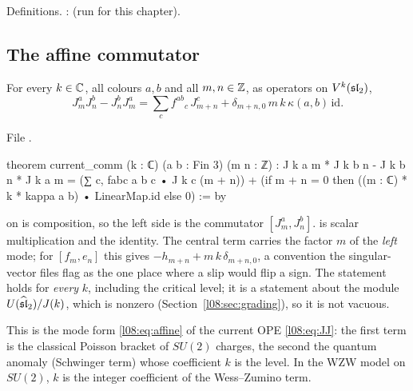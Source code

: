 \begin{status}
Definitions. : \lean{[propext, Classical.}\allowbreak{}\allowbreak\lean{sound]} (run for
this chapter).
\end{status}

\subsection{The affine commutator}

\begin{theorem}\label{l08:thm:currentcomm}
For every $k\in{\mathbb{C}}$, all colours $a,b$ and all $m,n\in{\mathbb{Z}}$, as operators on $V^k(\mathfrak{sl}_2)$,
\begin{equation*}
  J^a_mJ^b_n - J^b_nJ^a_m = \sum_c f^{ab}{}_c\,J^c_{m+n} + \delta_{m+n,0}\,m\,k\,\kappa(a,b)\,\mathrm{id}.
\end{equation*}
\end{theorem}

\noindent File .
\begin{leancode}
theorem current_comm (k : ℂ) (a b : Fin 3) (m n : ℤ) :
    J k a m * J k b n - J k b n * J k a m
      = (∑ c, fabc a b c • J k c (m + n))
        + (if m + n = 0 then ((m : ℂ) * k * kappa a b) • LinearMap.id else 0) := by
\end{leancode}

\begin{dictionary}
\lean{*} on \allowbreak{} is composition, so the left side is the commutator
$[J^a_m,J^b_n]$.  is scalar multiplication and  the identity. The central
term carries the factor $m$ of the \emph{left} mode; for $[f_m,e_n]$ this gives
$-h_{m+n}+m\,k\,\delta_{m+n,0}$, a convention the singular-vector files flag as the one place where a
slip would flip a sign. The statement holds for \emph{every} $k$, including the critical level; it is a
statement about the module $U(\widehat{\mathfrak{sl}}_2)/J(k)$, which is nonzero (Section~\ref{l08:sec:grading}),
so it is not vacuous.
\end{dictionary}

\begin{physics}
This is the mode form \eqref{l08:eq:affine} of the current OPE \eqref{l08:eq:JJ}: the first term is the
classical Poisson bracket of $SU(2)$ charges, the second the quantum anomaly (Schwinger term) whose
coefficient $k$ is the level. In the WZW model on $SU(2)$, $k$ is the integer coefficient of the
Wess--Zumino term.
\end{physics}


